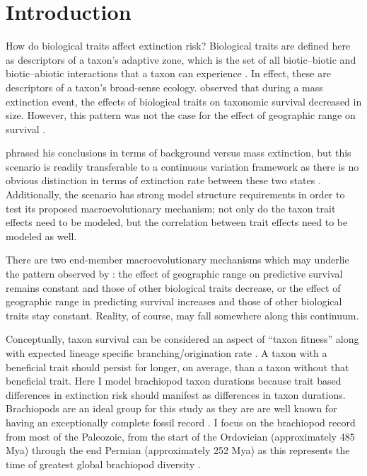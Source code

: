 \documentclass{article}
\begin{document}
\section{Introduction}

How do biological traits affect extinction risk? Biological traits are defined here as descriptors of a taxon's adaptive zone, which is the set of all biotic--biotic and biotic--abiotic interactions that a taxon can experience \citep{Simpson1944}. In effect, these are descriptors of a taxon's broad-sense ecology. \citet{Jablonski1986} observed that during a mass extinction event, the effects of biological traits on taxonomic survival decreased in size. However, this pattern was not the case for the effect of geographic range on survival \citep{Jablonski1986}. 

\citet{Jablonski1986} phrased his conclusions in terms of background versus mass extinction, but this scenario is readily transferable to a continuous variation framework as there is no obvious distinction in terms of extinction rate between these two states \citep{Wang2003}. Additionally, the \citet{Jablonski1986} scenario has strong model structure requirements in order to test its proposed macroevolutionary mechanism; not only do the taxon trait effects need to be modeled, but the correlation between trait effects need to be modeled as well. 

There are two end-member macroevolutionary mechanisms which may underlie the pattern observed by \citet{Jablonski1986}: the effect of geographic range on predictive survival remains constant and those of other biological traits decrease, or the effect of geographic range in predicting survival increases and those of other biological traits stay constant. Reality, of course, may fall somewhere along this continuum. %

Conceptually, taxon survival can be considered an aspect of ``taxon fitness'' along with expected lineage specific branching/origination rate \citep{Cooper1984,Palmer2012}. A taxon with a beneficial trait should persist for longer, on average, than a taxon without that beneficial trait. Here I model brachiopod taxon durations because trait based differences in extinction risk should manifest as differences in taxon durations. Brachiopods are an ideal group for this study as they are are well known for having an exceptionally complete fossil record \citep{Foote2000a}. I focus on the brachiopod record from most of the Paleozoic, from the start of the Ordovician (approximately 485 Mya) through the end Permian (approximately 252 Mya) as this represents the time of greatest global brachiopod diversity \citep{Alroy2010}.
\end{document}
